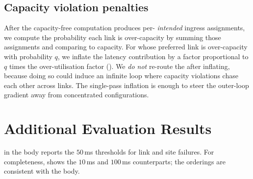 \documentclass[acmsmall,anonymous,review,nonacm,10pt]{acmart}
\begin{document}
\subsection{Capacity violation penalties}
\label{ap:heuristics-capacity}

After the capacity-free computation produces per-\ug
\emph{intended} ingress assignments, we compute the probability
each link is over-capacity by summing those assignments and
comparing to capacity.  For \ugs whose preferred link is
over-capacity with probability $q$, we inflate the latency
contribution by a factor proportional to $q$ times the
over-utilisation factor ().
We \emph{do not} re-route the \ug after inflating, because doing
so could induce an infinite loop where capacity violations chase
each other across links.  The single-pass inflation is enough to
steer the outer-loop gradient away from concentrated
configurations.

\section{Additional Evaluation Results}
\label{ap:additional}

 in the body reports the
$50$\,ms thresholds for link and site failures.  For completeness,
 shows the $10$\,ms and $100$\,ms
counterparts; the orderings are consistent with the body.
\end{document}
